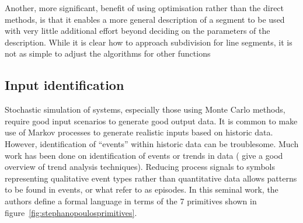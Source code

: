 Another, more significant, benefit of using optimisation rather than the direct methods, is that it enables a more general description of a segment to be used with very little additional effort beyond deciding on the parameters of the description.
While it is clear how to approach subdivision for line segments, it is not as simple to adjust the algorithms for other functions~\citep{waibel.lee1990readings}

\subsection{Input identification}
Stochastic simulation of systems, especially those using Monte Carlo methods, require good input scenarios to generate good output data.
It is common to make use of Markov processes to generate realistic inputs based on historic data.
However, identification of ``events'' within historic data can be troublesome.  
Much work has been done on identification of events or trends in data (\citet{maurya.rengaswamy.ea2007fault} give a good overview of trend analysis techniques).  
Reducing process signals to symbols representing qualitative event types rather than quantitative data allows patterns to be found in events, or what \citet{cheung.stephanopoulos1990representation} refer to as episodes.  
In this seminal work, the authors define a formal language in terms of the 7 primitives shown in figure~\ref{fig:stephanopoulosprimitives}.

